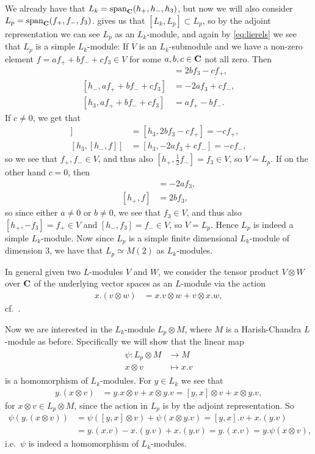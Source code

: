 We already have that $L_k=\operatorname{span}_{\mathbf{C}}(h_+,h_-,h_3)$, but now we will also consider $L_p=\operatorname{span}_{\mathbf{C}}(f_+,f_-,f_3)$.  gives us that $[L_k,L_p]\subset L_p$, so by the adjoint representation we can see $L_p$ as an $L_k$-module, and again by \cref{eq:lierels} we see that $L_p$ is a simple $L_k$-module: If $V$ is an $L_k$-submodule and we have a non-zero element $f=af_++bf_-+cf_3\in V$ for some $a,b,c\in\mathbf{C}$ not all zero. Then
\begin{align*}
  [h_+,af_++bf_-+cf_3] &= 2bf_3-cf_+, \\
  [h_-,af_++bf_-+cf_3] &= -2af_3+cf_-, \\
  [h_3,af_++bf_-+cf_3] &= af_+-bf_-.
\end{align*}
If $c\neq0$, we get that
\begin{align*}
  [h_3,[h_+,f]] &= [h_3,2bf_3-cf_+] = -cf_+, \\
  [h_3,[h_-,f]] &= [h_3,-2af_3+cf_-] = -cf_-,
\end{align*}
so we see that $f_+,f_-\in V$, and thus also $[h_+,\tfrac{1}{2}f_-]=f_3\in V$, so $V=L_p$. If on the other hand $c=0$, then
\begin{align*}
  [h_-,f] &= -2af_3, \\
  [h_+,f] &= 2bf_3,
\end{align*}
so since either $a\neq 0$ or $b\neq 0$, we see that $f_3\in V$, and thus also $[h_+,-f_3]=f_+\in V$ and $[h_-,f_3]=f_-\in V$, so $V=L_p$. Hence $L_p$ is indeed a simple $L_k$-module. Now since $L_p$ is a simple finite dimensional $L_k$-module of dimension 3, we have that $L_p\simeq M(2)$ as $L_k$-modules.

In general given two $L$-modules $V$ and $W$, we consider the tensor product $V\otimes W$ over $\mathbf{C}$ of the underlying vector spaces as an $L$-module via the action
\begin{align*}
  x.(v\otimes w) &= x.v\otimes w + v\otimes x.w,
\end{align*}
cf.\ \cite[26]{humphrey}.

Now we are interested in the $L_k$-module $L_p\otimes M$, where $M$ is a Harish-Chandra $L$-module as before. Specifically we will show that the linear map
\begin{align}
  \begin{split} \label{eq:psi}
    \psi \colon L_p\otimes M &\to M \\
    x\otimes v &\mapsto x.v
  \end{split}
\end{align}
is a homomorphism of $L_k$-modules. For $y\in L_k$ we see that
\begin{align*}
  y.(x\otimes v) &= y.x\otimes v + x\otimes y.v = [y,x]\otimes v + x\otimes y.v,
\end{align*}
for $x\otimes v\in L_p\otimes M$, since the action in $L_p$ is by the adjoint representation. So
\begin{align*}
  \psi(y.(x\otimes v)) &= \psi([y,x]\otimes v) + \psi(x\otimes y.v) = [y,x].v + x.(y.v) \\
  &= y.(x.v)-x.(y.v)+x.(y.v) = y.(x.v) = y.\psi(x\otimes v),
\end{align*}
i.e.\ $\psi$ is indeed a homomorphism of $L_k$-modules.

